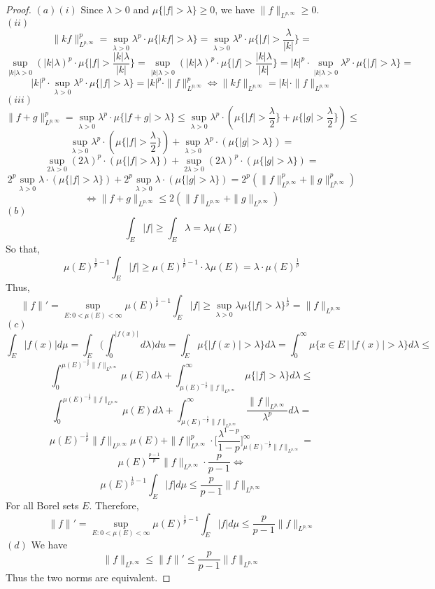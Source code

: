 \documentclass[12pt]{article}
\begin{document}
\begin{proof}
  $(a) (i)$ Since $\lambda > 0$ and $\mu\{|f| > \lambda\} \ge 0$, we have $\|f\|_{L^{p, \infty}}\ge 0$.\\
  $(ii)$
  $$\|kf\|_{L^{p, \infty}}^p = \sup_{\lambda > 0} \lambda^p \cdot \mu\{|kf| > \lambda\} = \sup_{\lambda > 0} \lambda^p \cdot \mu\{|f| > \frac{\lambda}{|k|}\} =$$
  $$\sup_{|k|\lambda > 0} (|k|\lambda)^p \cdot \mu\{|f| > \frac{|k|\lambda}{|k|}\} = \sup_{|k|\lambda > 0} (|k|\lambda)^p \cdot \mu\{|f| > \frac{|k|\lambda}{|k|}\} =
  |k|^p \cdot \sup_{|k|\lambda > 0} \lambda^p \cdot \mu\{|f| > \lambda\} =$$
  $$|k|^p \cdot \sup_{\lambda > 0} \lambda^p \cdot \mu\{|f| > \lambda\} = |k|^p \cdot \|f\|_{L^{p, \infty}}^p \iff \|kf\|_{L^{p, \infty}} = |k| \cdot \|f\|_{L^{p, \infty}}$$
  $(iii)$
  $$\|f + g\|_{L^{p, \infty}}^p = \sup_{\lambda > 0} \lambda^p \cdot \mu\{|f + g| > \lambda\} \le \sup_{\lambda > 0} \lambda^p \cdot (\mu\{|f| > \frac{\lambda}{2}\} + \mu\{|g| > \frac{\lambda}{2}\}) \le$$
  $$\sup_{\lambda > 0} \lambda^p \cdot (\mu\{|f| > \frac{\lambda}{2}\}) + \sup_{\lambda > 0} \lambda^p \cdot (\mu\{|g| > \lambda\}) =$$
  $$\sup_{2\lambda > 0} (2\lambda)^p \cdot (\mu\{|f| > \lambda\}) + \sup_{2\lambda > 0} (2\lambda)^p \cdot (\mu\{|g| > \lambda\}) =$$
  $$2^p\sup_{\lambda > 0} \lambda \cdot (\mu\{|f| > \lambda\}) + 2^p\sup_{\lambda > 0} \lambda \cdot (\mu\{|g| > \lambda\}) = 2^p (\|f\|_{L^{p, \infty}}^p + \|g\|_{L^{p, \infty}}^p)$$
  $$\iff \|f + g\|_{L^{p, \infty}} \le 2(\|f\|_{L^{p, \infty}} + \|g\|_{L^{p, \infty}})$$
  $(b)$
  $$\int_E |f| \ge \int_E \lambda = \lambda \mu(E)$$
  So that,
  $$\mu(E)^{\frac{1}{p}-1} \int_E |f| \ge \mu(E)^{\frac{1}{p}-1} \cdot \lambda \mu(E) = \lambda \cdot \mu(E)^{\frac{1}{p}}$$
  Thus,
  $$\|f\|' = \sup_{E: 0 < \mu(E) < \infty} \mu(E)^{\frac{1}{p}-1} \int_E |f| \ge \sup_{\lambda > 0} \lambda \mu\{|f| > \lambda\}^{\frac{1}{p}} = \|f\|_{L^{p, \infty}}$$
  $(c)$
  $$\int_E |f(x)| d\mu = \int_E \Big(\int_0^{|f(x)|} d\lambda \Big) du = \int_E \mu\{|f(x)| > \lambda\} d\lambda = \int_0^{\infty} \mu\{x \in E\ |\ |f(x)| > \lambda\} d\lambda \le$$
  $$\int_0^{\mu(E)^{-\frac{1}{p}}\|f\|_{L^{p, \infty}}} \mu(E) d\lambda + \int_{\mu(E)^{-\frac{1}{p}}\|f\|_{L^{p, \infty}}}^{\infty} \mu\{|f| > \lambda\} d\lambda \le$$
  $$\int_0^{\mu(E)^{-\frac{1}{p}}\|f\|_{L^{p, \infty}}} \mu(E) d\lambda + \int_{\mu(E)^{-\frac{1}{p}}\|f\|_{L^{p, \infty}}}^{\infty} \dfrac{\|f\|_{L^{p, \infty}}}{\lambda^p} d\lambda = $$
  $$\mu(E)^{-\frac{1}{p}}\|f\|_{L^{p, \infty}}\mu(E) + \|f\|_{L^{p, \infty}}^p \cdot \Big[\dfrac{\lambda^{1-p}}{1-p}\Big]_{\mu(E)^{-\frac{1}{p}}\|f\|_{L^{p, \infty}}}^{\infty} =$$
  $$\mu(E)^{\frac{p-1}{p}} \|f\|_{L^{p, \infty}} \cdot \dfrac{p}{p-1} \iff$$
  $$\mu(E)^{\frac{1}{p} - 1} \int_E |f| d\mu \le \dfrac{p}{p-1} \|f\|_{L^{p, \infty}}$$
  For all Borel sets $E$. Therefore,
  $$\|f\|' = \sup_{E: 0 < \mu(E) < \infty} \mu(E)^{\frac{1}{p} - 1} \int_E |f| d\mu \le \dfrac{p}{p-1} \|f\|_{L^{p, \infty}}$$
  $(d)$ We have
  $$\|f\|_{L^{p, \infty}} \le \|f\|' \le \dfrac{p}{p-1} \|f\|_{L^{p, \infty}}$$
  Thus the two norms are equivalent.
\end{proof}
\end{document}
